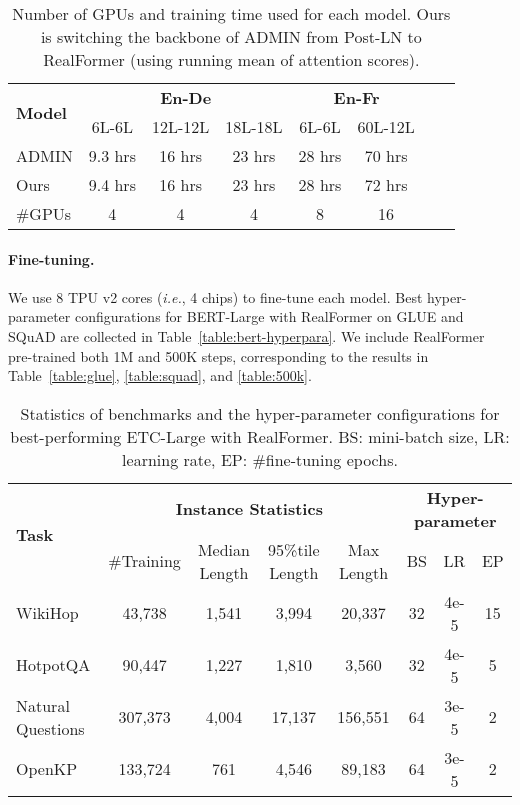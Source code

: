 \documentclass[11pt,a4paper]{article}
\begin{document}
\begin{table}[h]
\setlength{\tabcolsep}{2.5pt}
\centering
\begin{tabular}{l|ccc|cccc} \hline
\multirow{2}{*}{\textbf{Model}}    &\multicolumn{3}{c|}{\textbf{En-De}}     &\multicolumn{2}{c}{\textbf{En-Fr}} \\
                          &\small{6L-6L} &\small{12L-12L} &\small{18L-18L}  &\small{6L-6L} &\small{60L-12L}     \\ \hline
ADMIN                     &9.3 hrs  &16 hrs   &23 hrs  &28 hrs   &70 hrs     \\
Ours                      &9.4 hrs  &16 hrs   &23 hrs  &28 hrs   &72 hrs    \\  \hline
\#GPUs                    &4 &4  &4 &8   &16     \\ \hline
\end{tabular}
\caption{Number of GPUs and training time used for each model. Ours is switching the backbone of ADMIN from Post-LN to RealFormer (using running mean of attention scores).}
\label{table:admin-time}
\end{table}

\paragraph{Fine-tuning.} 
We use 8 TPU v2 cores (\emph{i.e.}, 4 chips) to fine-tune each model.
Best hyper-parameter configurations for BERT-Large with RealFormer on GLUE and SQuAD are collected in Table~\ref{table:bert-hyperpara}. 
We include RealFormer pre-trained both 1M and 500K steps, corresponding to the results in Table~\ref{table:glue}, \ref{table:squad}, and \ref{table:500k}.



\begin{table*}[!h]
\setlength{\tabcolsep}{5pt}
\centering
\begin{tabular}{l|cccc|ccc}
\hline 
\multirow{2}{*}{\textbf{Task}}   &\multicolumn{4}{c|}{\textbf{Instance Statistics}}    &\multicolumn{3}{c}{\textbf{Hyper-parameter}}  \\
                                &\#Training  &Median Length  &95\%tile Length  &Max Length    &{BS}  &{LR}   &{EP}  \\ \hline
WikiHop                         &43,738      &1,541          &3,994            &20,337        &32    &4e-5   &15    \\ 
HotpotQA                        &90,447      &1,227          &1,810            &3,560         &32    &4e-5   &5     \\ 
Natural Questions               &307,373     &4,004          &17,137           &156,551       &64    &3e-5   &2     \\ 
OpenKP                          &133,724     &761            &4,546            &89,183        &64    &3e-5   &2     \\ \hline 
\end{tabular}
\caption{Statistics of benchmarks and the hyper-parameter configurations for best-performing ETC-Large with RealFormer. BS: mini-batch size, LR: learning rate, EP: \#fine-tuning epochs.}
\label{table:etc-hyperpara}
\end{table*}
\end{document}
